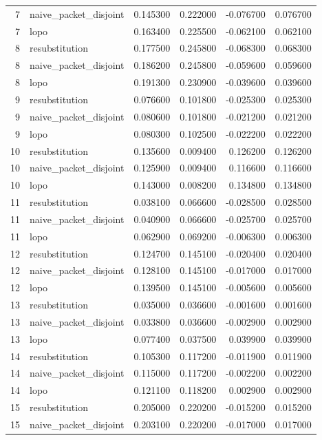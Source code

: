 \begin{table}
\begin{tabular}{rlrrrr}
7 & naive_packet_disjoint & 0.145300 & 0.222000 & -0.076700 & 0.076700 \\
7 & lopo & 0.163400 & 0.225500 & -0.062100 & 0.062100 \\
8 & resubstitution & 0.177500 & 0.245800 & -0.068300 & 0.068300 \\
8 & naive_packet_disjoint & 0.186200 & 0.245800 & -0.059600 & 0.059600 \\
8 & lopo & 0.191300 & 0.230900 & -0.039600 & 0.039600 \\
9 & resubstitution & 0.076600 & 0.101800 & -0.025300 & 0.025300 \\
9 & naive_packet_disjoint & 0.080600 & 0.101800 & -0.021200 & 0.021200 \\
9 & lopo & 0.080300 & 0.102500 & -0.022200 & 0.022200 \\
10 & resubstitution & 0.135600 & 0.009400 & 0.126200 & 0.126200 \\
10 & naive_packet_disjoint & 0.125900 & 0.009400 & 0.116600 & 0.116600 \\
10 & lopo & 0.143000 & 0.008200 & 0.134800 & 0.134800 \\
11 & resubstitution & 0.038100 & 0.066600 & -0.028500 & 0.028500 \\
11 & naive_packet_disjoint & 0.040900 & 0.066600 & -0.025700 & 0.025700 \\
11 & lopo & 0.062900 & 0.069200 & -0.006300 & 0.006300 \\
12 & resubstitution & 0.124700 & 0.145100 & -0.020400 & 0.020400 \\
12 & naive_packet_disjoint & 0.128100 & 0.145100 & -0.017000 & 0.017000 \\
12 & lopo & 0.139500 & 0.145100 & -0.005600 & 0.005600 \\
13 & resubstitution & 0.035000 & 0.036600 & -0.001600 & 0.001600 \\
13 & naive_packet_disjoint & 0.033800 & 0.036600 & -0.002900 & 0.002900 \\
13 & lopo & 0.077400 & 0.037500 & 0.039900 & 0.039900 \\
14 & resubstitution & 0.105300 & 0.117200 & -0.011900 & 0.011900 \\
14 & naive_packet_disjoint & 0.115000 & 0.117200 & -0.002200 & 0.002200 \\
14 & lopo & 0.121100 & 0.118200 & 0.002900 & 0.002900 \\
15 & resubstitution & 0.205000 & 0.220200 & -0.015200 & 0.015200 \\
15 & naive_packet_disjoint & 0.203100 & 0.220200 & -0.017000 & 0.017000 \\

\end{tabular}
\end{table}
